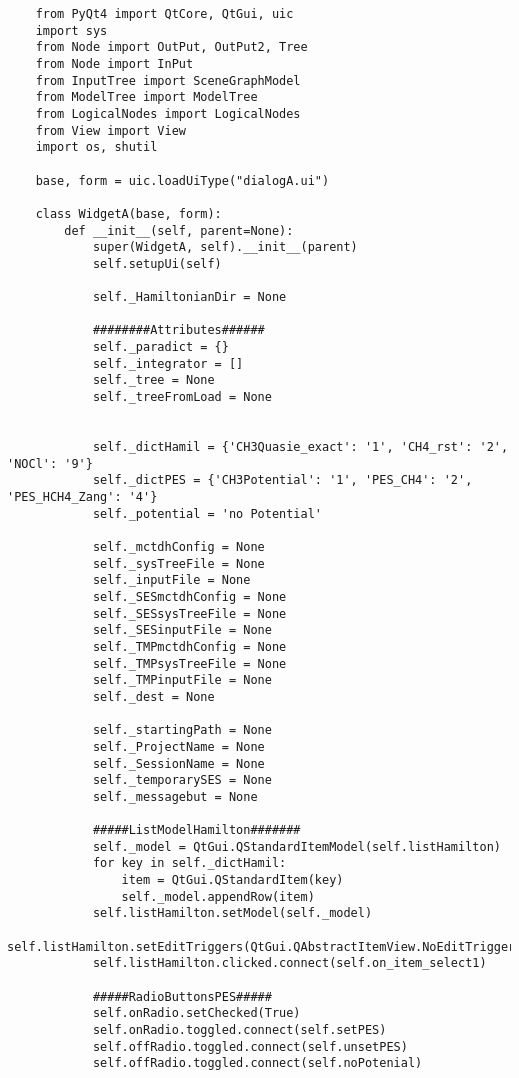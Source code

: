 \begin{verbatim}
    from PyQt4 import QtCore, QtGui, uic
    import sys
    from Node import OutPut, OutPut2, Tree
    from Node import InPut
    from InputTree import SceneGraphModel
    from ModelTree import ModelTree
    from LogicalNodes import LogicalNodes
    from View import View
    import os, shutil
    
    base, form = uic.loadUiType("dialogA.ui")
    
    class WidgetA(base, form):
        def __init__(self, parent=None):
            super(WidgetA, self).__init__(parent)
            self.setupUi(self)
    
            self._HamiltonianDir = None
            
            ########Attributes######
            self._paradict = {}
            self._integrator = []
            self._tree = None
            self._treeFromLoad = None
    
    
            self._dictHamil = {'CH3Quasie_exact': '1', 'CH4_rst': '2', 'NOCl': '9'}
            self._dictPES = {'CH3Potential': '1', 'PES_CH4': '2', 'PES_HCH4_Zang': '4'}
            self._potential = 'no Potential'
    
            self._mctdhConfig = None 
            self._sysTreeFile = None
            self._inputFile = None
            self._SESmctdhConfig = None
            self._SESsysTreeFile = None
            self._SESinputFile = None
            self._TMPmctdhConfig = None
            self._TMPsysTreeFile = None
            self._TMPinputFile = None
            self._dest = None
    
            self._startingPath = None
            self._ProjectName = None
            self._SessionName = None
            self._temporarySES = None
            self._messagebut = None
    
            #####ListModelHamilton#######
            self._model = QtGui.QStandardItemModel(self.listHamilton)
            for key in self._dictHamil:
                item = QtGui.QStandardItem(key)
                self._model.appendRow(item)
            self.listHamilton.setModel(self._model)
            self.listHamilton.setEditTriggers(QtGui.QAbstractItemView.NoEditTriggers)
            self.listHamilton.clicked.connect(self.on_item_select1)
    
            #####RadioButtonsPES#####
            self.onRadio.setChecked(True)
            self.onRadio.toggled.connect(self.setPES)
            self.offRadio.toggled.connect(self.unsetPES)
            self.offRadio.toggled.connect(self.noPotenial)
    

\end{verbatim}

